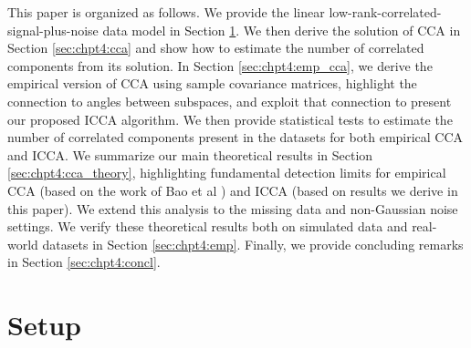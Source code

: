 This paper is organized as follows. We provide the linear
low-rank-correlated-signal-plus-noise data model in Section \ref{sec:chpt4:model}. We then
derive the solution of CCA in Section \ref{sec:chpt4:cca} and show how to estimate the
number of correlated components from its solution. In Section \ref{sec:chpt4:emp_cca}, we
derive the empirical version of CCA using sample covariance matrices, highlight the
connection to angles between subspaces, and exploit that connection to present our
proposed ICCA algorithm. We then provide statistical tests to estimate the number of
correlated components present in the datasets for both empirical CCA and ICCA. We
summarize our main theoretical results in Section \ref{sec:chpt4:cca_theory}, highlighting
fundamental detection limits for empirical CCA (based on the work of Bao et al
\cite{bao2014canonical}) and ICCA (based on results we derive in this paper). We extend
this analysis to the missing data and non-Gaussian noise settings.  We verify these
theoretical results both on simulated data and real-world datasets in Section
\ref{sec:chpt4:emp}. Finally, we provide concluding remarks in Section
\ref{sec:chpt4:concl}.


\section{Setup}\label{sec:chpt4:model}

